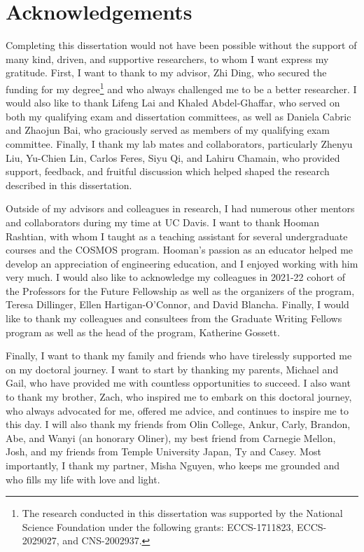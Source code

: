 \chapter*{Acknowledgements}

Completing this dissertation would not have been possible without the support of many kind, driven, and supportive researchers, to whom I want express my gratitude. First, I want to thank to my advisor, Zhi Ding, who secured the funding for my degree\footnote{The research conducted in this dissertation was supported by the National Science Foundation under the following grants: ECCS-1711823, ECCS-2029027, and CNS-2002937.} and who always challenged me to be a better researcher. I would also like to thank Lifeng Lai and Khaled Abdel-Ghaffar, who served on both my qualifying exam and dissertation committees, as well as Daniela Cabric and Zhaojun Bai, who graciously served as members of my qualifying exam committee. Finally, I thank my lab mates and collaborators, particularly Zhenyu Liu, Yu-Chien Lin, Carlos Feres, Siyu Qi, and Lahiru Chamain, who provided support, feedback, and fruitful discussion which helped shaped the research described in this dissertation.

Outside of my advisors and colleagues in research, I had numerous other mentors and collaborators during my time at UC Davis. I want to thank Hooman Rashtian, with whom I taught as a teaching assistant for several undergraduate courses and the COSMOS program. Hooman's passion as an educator helped me develop an appreciation of engineering education, and I enjoyed working with him very much. I would also like to acknowledge my colleagues in 2021-22 cohort of the Professors for the Future Fellowship as well as the organizers of the program, Teresa Dillinger, Ellen Hartigan-O'Connor, and David Blancha. Finally, I would like to thank my colleagues and consultees from the Graduate Writing Fellows program as well as the head of the program, Katherine Gossett.

Finally, I want to thank my family and friends who have tirelessly supported me on my doctoral journey. I want to start by thanking my parents, Michael and Gail, who have provided me with countless opportunities to succeed. I also want to thank my brother, Zach, who inspired me to embark on this doctoral journey, who always advocated for me, offered me advice, and continues to inspire me to this day. I will also thank my friends from Olin College, Ankur, Carly, Brandon, Abe, and Wanyi (an honorary Oliner), my best friend from Carnegie Mellon, Josh, and my friends from Temple University Japan, Ty and Casey. Most importantly, I thank my partner, Misha Nguyen, who keeps me grounded and who fills my life with love and light.

